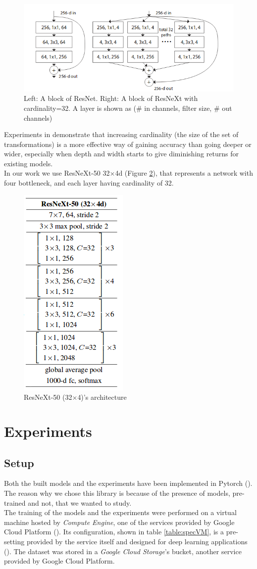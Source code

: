 \documentclass{article}
\begin{document}
\begin{figure}[h]
	\centering
	\includegraphics[width=0.7\linewidth]{image/resnext}
	\caption{Left: A block of ResNet. Right: A block of ResNeXt with cardinality=32. A layer is shown as (\# in channels, filter size, \# out channels)}
	\label{fig:resnext_block}
\end{figure}

Experiments in \cite{resneXt} demonstrate that increasing cardinality (the size of the set of transformations) is a more effective way of gaining accuracy than going deeper or wider, especially when depth and width starts to give diminishing returns for existing models.\\
In our work we use ResNeXt-50 32$\times$4d (Figure \ref{fig:res}), that represents a network with four bottleneck, and each layer having cardinality of 32. 

\begin{figure}
	\centering
	\includegraphics[height=0.4\linewidth]{image/res}
	\caption{ResNeXt-50 (32$\times$4)'s architecture}
	\label{fig:res}
\end{figure}
\section{Experiments}\label{experiments}

\subsection{Setup}
Both the built models and the experiments have been implemented in Pytorch (\cite{pytorch}). The reason why we chose this library is because of the presence of models, pre-trained and not, that we wanted to study.\\
The training of the models and the experiments were performed on a virtual machine hosted by \textit{Compute Engine}, one of the services provided by Google Cloud Platform (\cite{gcloud}). Its configuration, shown in table \ref{table:specVM}, is a pre-setting provided by the service itself and designed for deep learning applications  (\cite{vmconfig}). The dataset was stored in a \textit{Google Cloud Storage}'s bucket, another service provided by Google Cloud Platform.
\end{document}
